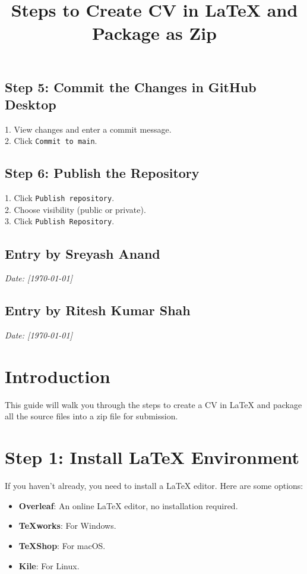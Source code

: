 \documentclass[a4paper,12pt]{article}
\begin{document}
\subsection*{Step 5: Commit the Changes in GitHub Desktop}
1. View changes and enter a commit message.\\
2. Click \texttt{Commit to main}.

\subsection*{Step 6: Publish the Repository}
1. Click \texttt{Publish repository}.\\
2. Choose visibility (public or private).\\
3. Click \texttt{Publish Repository}.

\subsection*{Entry by Sreyash Anand}
\textit{Date: [\today]}\\

\subsection*{Entry by Ritesh Kumar Shah}
\textit{Date: [\today]}\\


\title{Steps to Create CV in LaTeX and Package as Zip}

\section*{Introduction}
This guide will walk you through the steps to create a CV in LaTeX and package all the source files into a zip file for submission.

\section{Step 1: Install LaTeX Environment}
If you haven't already, you need to install a LaTeX editor. Here are some options:
\begin{itemize}
    \item \textbf{Overleaf}: An online LaTeX editor, no installation required.
    \item \textbf{TeXworks}: For Windows.
    \item \textbf{TeXShop}: For macOS.
    \item \textbf{Kile}: For Linux.
\end{itemize}
\end{document}
